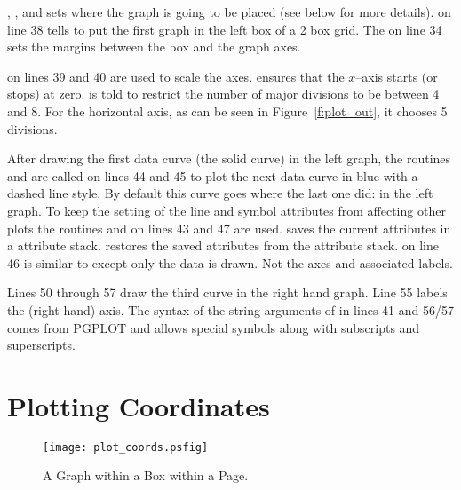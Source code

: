 , , and  sets
where the graph is going to be placed (see below for more details).
 on line 38 tells \quickplot to put the
first graph in the left box of a 2 box grid. The  on
line 34 sets the margins between the box and the graph axes.

 on lines 39 and 40 are used to scale the
axes.  ensures that the $x$--axis starts (or stops)
at zero.   is told to restrict the number of
major divisions to be between 4 and 8. For the horizontal axis, as can be
seen in Figure~\ref{f:plot_out}, it chooses 5 divisions.

After drawing the first data curve (the solid curve) in the left
graph, the routines  and
 are called on lines 44 and 45 to plot the next
data curve in blue with a dashed line style. By default this curve
goes where the last one did: in the left graph. To keep the setting of
the line and symbol attributes from affecting other plots the routines
 and  on lines 43 and 47 are
used.  saves the current attributes in a attribute
stack.  restores the saved attributes from the
attribute stack.  on line 46 is similar to
 except only the data is drawn. Not the axes and
associated labels.

Lines 50 through 57 draw the third curve in the right hand graph.
Line 55 labels the  (right hand) axis. The syntax of the
string arguments of  in lines 41 and 56/57 comes
from PGPLOT and allows special symbols along with subscripts and
superscripts.

\section{Plotting Coordinates}
\label{s:plot_coords}

\begin{figure}
  \centering
  \texttt{[image: plot\_coords.psfig]}
  \caption{A Graph within a Box within a Page.}
  \label{f:plot_coords}
\end{figure}

